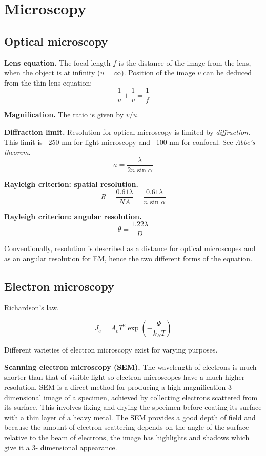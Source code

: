 \section{Microscopy}

\subsection*{Optical microscopy}

\textbf{Lens equation.} The focal length $f$ is the distance of the image from the lens, when the object is at infinity ($u = \infty$). Position
of the image $v$ can be deduced from the thin lens equation: $$\frac{1}{u} + \frac{1}{v} = \frac{1}{f}$$

\textbf{Magnification.} The ratio is given by $v/u$.

\textbf{Diffraction limit.} Resolution for optical microscopy is limited by \textit{diffraction}. This limit is ~250 nm for light microscopy 
and ~100 nm for confocal. See \textit{Abbe's theorem}. $$a = \frac{\lambda}{2n \sin \alpha}$$

\textbf{Rayleigh criterion: spatial resolution.}
\begin{equation*}
    R = \frac{0.61 \lambda}{NA} = \frac{0.61 \lambda}{n \sin \alpha}
\end{equation*}

\textbf{Rayleigh criterion: angular resolution.}
\begin{equation*}
    \theta = \frac{1.22 \lambda}{D}
\end{equation*}

Conventionally, resolution is described as a distance for optical microscopes and as an angular resolution for EM, hence the two different forms of the equation.

\subsection*{Electron microscopy}

Richardson's law.

\begin{equation*}
    J_c = A_c T^2 \exp \left(- \frac{\Psi}{k_B T}\right)
\end{equation*}

Different varieties of electron microscopy exist for varying purposes.

\textbf{Scanning electron microscopy (SEM).} The wavelength of electrons is much shorter than that of visible light so electron microscopes have a much higher resolution.
SEM is a direct method for producing a high magnification 3-dimensional image of a specimen, achieved by collecting electrons scattered from its surface. This involves fixing and drying the specimen before coating its surface with a thin layer of a heavy metal. The SEM provides a good depth of field and because the amount of electron scattering depends on the angle of the surface relative to the beam of electrons, the image has highlights and shadows which give it a 3- dimensional appearance.

